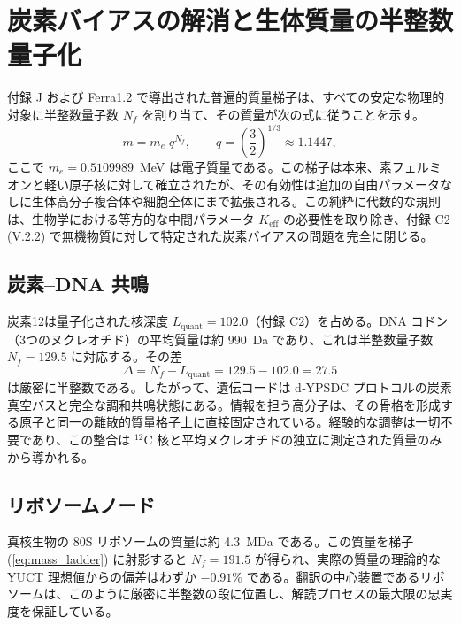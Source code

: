 \documentclass[12pt,a4paper]{ltjsarticle}
\begin{document}
	\section{炭素バイアスの解消と生体質量の半整数量子化}
	\label{sec:quantization}
	
	付録 J および Ferra1.2 で導出された普遍的質量梯子は、すべての安定な物理的対象に半整数量子数 \(N_f\) を割り当て、その質量が次の式に従うことを示す。
	\begin{equation}
		m = m_e \; q^{N_f}, \qquad q = \left(\frac{3}{2}\right)^{1/3} \approx 1.1447,
		\label{eq:mass_ladder}
	\end{equation}
	ここで \(m_e = 0.5109989\)~MeV は電子質量である。この梯子は本来、素フェルミオンと軽い原子核に対して確立されたが、その有効性は追加の自由パラメータなしに生体高分子複合体や細胞全体にまで拡張される。この純粋に代数的な規則は、生物学における等方的な中間パラメータ \(K_{\mathrm{eff}}\) の必要性を取り除き、付録 C2 (V.2.2) で無機物質に対して特定された炭素バイアスの問題を完全に閉じる。
	
	\subsection{炭素–DNA 共鳴}
	炭素12は量子化された核深度 \(L_{\mathrm{quant}} = 102.0\)（付録 C2）を占める。DNA コドン（3つのヌクレオチド）の平均質量は約 990~Da であり、これは半整数量子数 \(N_f = 129.5\) に対応する。その差
	\[
	\Delta = N_f - L_{\mathrm{quant}} = 129.5 - 102.0 = 27.5
	\]
	は厳密に半整数である。したがって、遺伝コードは d‑YPSDC プロトコルの炭素真空バスと完全な調和共鳴状態にある。情報を担う高分子は、その骨格を形成する原子と同一の離散的質量格子上に直接固定されている。経験的な調整は一切不要であり、この整合は \(^{12}\mathrm{C}\) 核と平均ヌクレオチドの独立に測定された質量のみから導かれる。
	
	\subsection{リボソームノード}
	真核生物の 80S リボソームの質量は約 4.3~MDa である。この質量を梯子 (\ref{eq:mass_ladder}) に射影すると \(N_f = 191.5\) が得られ、実際の質量の理論的な YUCT 理想値からの偏差はわずか \(-0.91\%\) である。翻訳の中心装置であるリボソームは、このように厳密に半整数の段に位置し、解読プロセスの最大限の忠実度を保証している。
	
\end{document}
